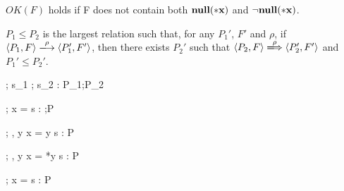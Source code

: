 \begin{myDef}
\label{df:okf}
\(OK(F)\) holds if F does not contain both \( \bf{null}(*x) \) and \( \neg\bf{null}(*x) \).
\end{myDef}


\begin{myDef}[Subtyping]
\(P_1 \le P_2\) is the largest relation such that, for any \(P_1'\), \(F'\)
and \(\rho\), if \( \langle P_1, F \rangle \xlongrightarrow{\rho} \langle P_1', F' \rangle \), then there
exists \(P_2'\) such that \( \langle P_2, F \rangle \xLongrightarrow{\rho} \langle P_2', F' \rangle \) and
\(P_1' \le P_2'\).
\label{df:subtype}
\end{myDef}


\begin{minipage}{\textwidth}

\begin{minipage}{0.5\textwidth}
\end{minipage}
\begin{minipage}{0.5\textwidth}
{\Theta ; \Gamma \vdash s_{1} ; s_{2} : P_{1};P_{2} }
\end{minipage}

\vspace{2mm}

\begin{minipage}{0.5\textwidth}
\end{minipage}
\begin{minipage}{0.5\textwidth}
\end{minipage}

\vspace{2mm}

\begin{minipage}{0.5\textwidth}
{\Theta ; \Gamma \vdash \LET x = \MALLOC \; \IN s  : \Malloc;P}
\end{minipage}
\begin{minipage}{0.5\textwidth}
{\Theta ; \Gamma, y \vdash \LET x = y \; \IN s : P}
\end{minipage}

\vspace{2mm}

\begin{minipage}{0.5\textwidth}
{\Theta ; \Gamma, y \vdash \LET x = *y \; \IN s : P}
\end{minipage}
\begin{minipage}{0.5\textwidth}
{\Theta ; \Gamma \vdash \LET x =  \; \IN s : P}
\end{minipage}


\end{minipage}
